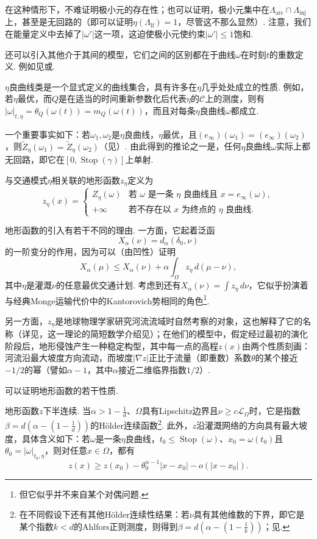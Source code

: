 在这种情形下，不难证明极小元的存在性；也可以证明，极小元集中在$\Lambda_{\mathrm{arc}}\cap\Lambda_{\mathrm{inj}}$上，甚至是无回路的（即可以证明$\eta(\Lambda_{\mathrm{lf}})=1$，尽管这不那么显然）. 注意，我们在能量定义中去掉了$|\omega'|$这一项，这迫使极小元使约束$|\omega'|\leq1$饱和.
\begin{remark}\label{obj:4.42}
还可以引入其他介于其间的模型，它们之间的区别都在于曲线$\omega$在时刻$t$的重数定义. 例如见\cite{b47}或\cite{b220}.
\end{remark}
$\eta$良曲线类是一个显式定义的曲线集合，具有许多在$\eta$几乎处处成立的性质. 例如，若$\eta$最优，而$Q$是在适当的时间重新参数化后代表$\eta$的$\mathscr C$上的测度，则有$|\omega|_{t,\eta}=\theta_Q(\omega(t))=m_Q(\omega(t))$，而且对每条$\eta$良曲线$\omega$都成立.

一个重要事实如下：若$\omega_1,\omega_2$是$\eta$良曲线，$\eta$最优，且$(e_\infty)(\omega_1)=(e_\infty)(\omega_2)$，则$\widetilde Z_\eta(\omega_1)=\widetilde Z_\eta(\omega_2)$（见\cite{b272}）. 由此得到的推论之一是，任何$\eta$良曲线$\omega$实际上都无回路，即它在$[0,\operatorname{Stop}(\gamma)]$上单射.
\begin{definition}[地形函数]\label{obj:4.43}
与交通模式$\eta$相关联的地形函数$z_\eta$定义为
\[
 z_\eta(x)=\begin{cases}
 Z_\eta(\omega)&\text{若 }\omega\text{ 是一条 }\eta\text{ 良曲线且 }x=e_\infty(\omega),\\
 +\infty&\text{若不存在以 }x\text{ 为终点的 }\eta\text{ 良曲线}.
 \end{cases}
\]
\end{definition}
地形函数的引入\cite{b272}有若干不同的理由. 一方面，它起着泛函
\[
 X_\alpha(\nu)=d_\alpha(\delta_0,\nu)
\]
的一阶变分的作用，因为可以（由凹性）证明
\[
 X_\alpha(\mu)\leq X_\alpha(\nu)
                   +\alpha\int_\Omega z_\eta\,d(\mu-\nu),
\]
其中$\eta$是灌溉$\nu$的任意最优交通计划. 考虑到还有$X_\alpha(\nu)=\int z_\eta\,d\nu$，它似乎扮演着与经典Monge运输代价中的Kantorovich势相同的角色\footnote{但它似乎并不来自某个对偶问题.}.

另一方面，$z_\eta$是地球物理学家研究河流流域时自然考察的对象，这也解释了它的名称（详见\cite{b263}，这一理论的简短数学介绍见\cite{b272}）；在他们的模型中，假定经过最初的演化阶段后，地形侵蚀产生一种稳定构型，其中每一点的高程$z(x)$由两个性质刻画：河流沿最大坡度方向流动，而坡度$|\nabla z|$正比于流量（即重数）系数$\theta$的某个接近$-1/2$的幂（譬如$\alpha-1$，其中$\alpha$接近二维临界指数$1/2$）.

可以证明地形函数的若干性质.
\begin{theorem}\label{obj:4.44}
地形函数$z$下半连续. 当$\alpha>1-\frac1d$、$\Omega$具有Lipschitz边界且$\nu\geq c\mathscr L_\Omega$时，它是指数$\beta=d(\alpha-(1-\frac1d))$的Hölder连续函数\footnote{在不同假设下还有其他Hölder连续性结果：若$\nu$具有其他维数的下界，即它是某个指数$k<d$的Ahlfors正则测度，则得到$\beta=d(\alpha-(1-\frac1k))$；见\cite{b78}.}. 此外，$z$沿灌溉网络的方向具有最大坡度，具体含义如下：若$\omega$是一条$\eta$良曲线，$t_0\leq\operatorname{Stop}(\omega)$、$x_0=\omega(t_0)$且$\theta_0=|\omega|_{t_0,\eta}$，则对任意$x\in\Omega$，都有
\[
 z(x)\geq z(x_0)-\theta_0^{\alpha-1}|x-x_0|-o(|x-x_0|).
\]
\end{theorem}

